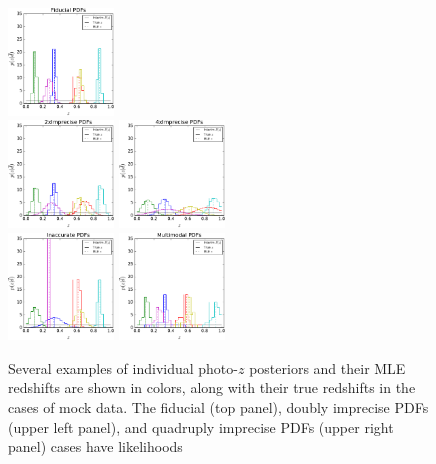 \documentclass[preprint]{aastex}
\begin{document}
\begin{figure}
\includegraphics[width=0.25\textwidth]{figs/null/samplepzs.pdf}\\
\includegraphics[width=0.25\textwidth]{figs/sig2/samplepzs.pdf}
\includegraphics[width=0.25\textwidth]{figs/sig4/samplepzs.pdf}\\
\includegraphics[width=0.25\textwidth]{figs/vars/samplepzs.pdf}
\includegraphics[width=0.25\textwidth]{figs/mult/samplepzs.pdf}\\
\caption{Several examples of individual photo-$z$ posteriors and their MLE 
redshifts are shown in colors, along with their true redshifts in the cases of 
mock data.  The fiducial (top panel), doubly imprecise PDFs (upper left panel), 
and quadruply imprecise PDFs (upper right panel) cases have likelihoods 
}
\end{figure}
\end{document}

